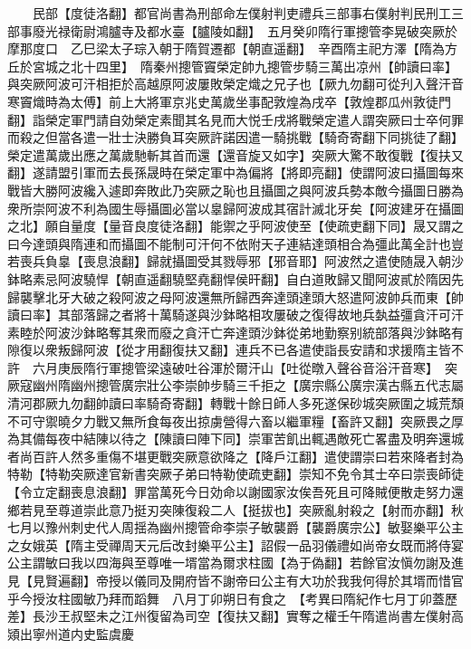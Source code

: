 　　民部【度徒洛翻】都官尚書為刑部命左僕射判吏禮兵三部事右僕射判民刑工三部事廢光禄衛尉鴻臚寺及都水臺【臚陵如翻】　五月癸卯隋行軍摠管李晃破突厥於摩那度口　乙巳梁太子琮入朝于隋賀遷都【朝直遥翻】　辛酉隋主祀方澤【隋為方丘於宮城之北十四里】　隋秦州摠管竇榮定帥九摠管步騎三萬出凉州【帥讀曰率】與突厥阿波可汗相拒於高越原阿波屢敗榮定熾之兄子也【厥九勿翻可從刋入聲汗音寒竇熾時為太傅】前上大將軍京兆史萬歲坐事配敦煌為戌卒【敦煌郡瓜州敦徒門翻】詣榮定軍門請自効榮定素聞其名見而大悦壬戌將戰榮定遣人謂突厥曰士卒何罪而殺之但當各遣一壯士決勝負耳突厥許諾因遣一騎挑戰【騎奇寄翻下同挑徒了翻】榮定遣萬歲出應之萬歲馳斬其首而還【還音旋又如字】突厥大驚不敢復戰【復扶又翻】遂請盟引軍而去長孫晟時在榮定軍中為偏將【將即亮翻】使謂阿波曰攝圖每來戰皆大勝阿波纔入遽即奔敗此乃突厥之恥也且攝圖之與阿波兵勢本敵今攝圖日勝為衆所崇阿波不利為國生辱攝圖必當以辠歸阿波成其宿計滅北牙矣【阿波建牙在攝圖之北】願自量度【量音良度徒洛翻】能禦之乎阿波使至【使疏吏翻下同】晟又謂之曰今達頭與隋連和而攝圖不能制可汗何不依附天子連結達頭相合為彊此萬全計也豈若喪兵負辠【喪息浪翻】歸就攝圖受其戮辱邪【邪音耶】阿波然之遣使随晟入朝沙鉢略素忌阿波驍悍【朝直遥翻驍堅堯翻悍侯旰翻】自白道敗歸又聞阿波貳於隋因先歸襲擊北牙大破之殺阿波之母阿波還無所歸西奔達頭達頭大怒遣阿波帥兵而東【帥讀曰率】其部落歸之者將十萬騎遂與沙鉢略相攻屢破之復得故地兵埶益彊貪汗可汗素睦於阿波沙鉢略奪其衆而廢之貪汗亡奔達頭沙鉢從弟地勤察别統部落與沙鉢略有隙復以衆叛歸阿波【從才用翻復扶又翻】連兵不已各遣使詣長安請和求援隋主皆不許　六月庚辰隋行軍摠管梁遠破吐谷渾於爾汗山【吐從暾入聲谷音浴汗音寒】　突厥寇幽州隋幽州摠管廣宗壯公李崇帥步騎三千拒之【廣宗縣公廣宗漢古縣五代志屬清河郡厥九勿翻帥讀曰率騎奇寄翻】轉戰十餘日師人多死遂保砂城突厥圍之城荒頹不可守禦曉夕力戰又無所食每夜出掠虜營得六畜以繼軍糧【畜許又翻】突厥畏之厚為其備每夜中結陳以待之【陳讀曰陣下同】崇軍苦飢出輒遇敵死亡畧盡及明奔還城者尚百許人然多重傷不堪更戰突厥意欲降之【降戶江翻】遣使謂崇曰若來降者封為特勒【特勒突厥達官新書突厥子弟曰特勒使疏吏翻】崇知不免令其士卒曰崇喪師徒【令立定翻喪息浪翻】罪當萬死今日効命以謝國家汝俟吾死且可降賊便散走努力還鄉若見至尊道崇此意乃挺刃突陳復殺二人【挺拔也】突厥亂射殺之【射而亦翻】秋七月以豫州刺史代人周揺為幽州摠管命李崇子敏襲爵【襲爵廣宗公】敏娶樂平公主之女娥英【隋主受禪周天元后改封樂平公主】詔假一品羽儀禮如尚帝女既而將侍宴公主謂敏曰我以四海與至尊唯一壻當為爾求柱國【為于偽翻】若餘官汝愼勿謝及進見【見賢遍翻】帝授以儀同及開府皆不謝帝曰公主有大功於我我何得於其壻而惜官乎今授汝柱國敏乃拜而蹈舞　八月丁卯朔日有食之　【考異曰隋紀作七月丁卯蓋歷差】長沙王叔堅未之江州復留為司空【復扶又翻】實奪之權壬午隋遣尚書左僕射高熲出寧州道内史監虞慶

